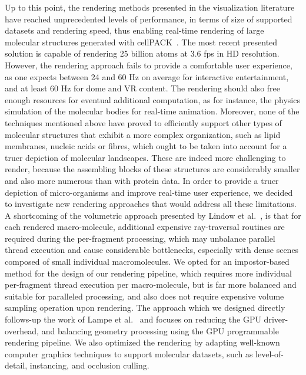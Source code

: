 Up to this point, the rendering methods presented in the visualization literature have reached unprecedented levels of performance, in terms of size of supported datasets and rendering speed, thus enabling real-time rendering of large molecular structures generated with cellPACK~\cite{johnson2015cellpack}.
The most recent presented solution is capable of rendering 25 billion atoms at 3.6 fps in HD resolution.
However, the rendering approach fails to provide a comfortable user experience, as one expects between 24 and 60 Hz on average for interactive entertainment, and at least 60 Hz for dome and VR content.
The rendering should also free enough resources for eventual additional computation, as for instance, the physics simulation of the molecular bodies for real-time animation.
Moreover, none of the techniques mentioned above have proved to efficiently support other types of molecular structures that exhibit a more complex organization, such as lipid membranes, nucleic acids or fibres, which ought to be taken into account for a truer depiction of molecular landscapes.
These are indeed more challenging to render, because the assembling blocks of these structures are considerably smaller and also more numerous than with protein data.
In order to provide a truer depiction of micro-organisms and improve real-time user experience, we decided to investigate new rendering approaches that would address all these limitations.
A shortcoming of the volumetric approach presented by Lindow et al.~\cite{lindow2012interactive}, is that for each rendered macro-molecule, additional expensive ray-traversal routines are required during the per-fragment processing, which may unbalance parallel thread execution and cause considerable bottlenecks, especially with dense scenes composed of small individual macromolecules.
We opted for an impostor-based method for the design of our rendering pipeline, which requires more individual per-fragment thread execution per macro-molecule, but is far more balanced and suitable for paralleled processing, and also does not require expensive volume sampling operation upon rendering. 
The approach which we designed directly follows-up the work of Lampe et al.~\cite{lampe2007two} and focuses on reducing the GPU driver-overhead, and balancing geometry processing using the GPU programmable rendering pipeline.
We also optimized the rendering by adapting well-known computer graphics techniques to support molecular datasets, such as level-of-detail, instancing, and occlusion culling. 

